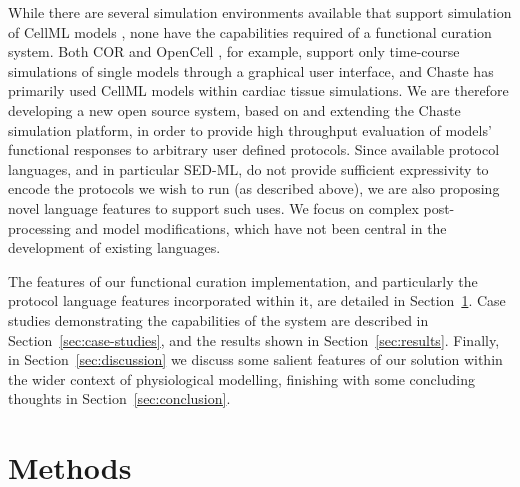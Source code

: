 \documentclass[preprint,authoryear,12pt]{elsarticle}
\newcommand{\secref}[1]{Section~\ref{#1}}
\newcommand{\changed}[1]{#1}
\begin{document}
\changed{While there are several simulation environments available that support simulation of CellML models \citep[see][]{Garny*.08:CellML}, none have the capabilities required of a functional curation system.
Both COR \citep{COR} and OpenCell \citep[formerly known as PCEnv,][]{Garny*.08:CellML}, for example, support only time-course simulations of single models through a graphical user interface, and Chaste \citep{Chaste.CPC} has primarily used CellML models within cardiac tissue simulations.
We are therefore developing a new open source system, based on and extending the Chaste simulation platform, in order to provide high throughput evaluation of models' functional responses to arbitrary user defined protocols.
Since available protocol languages, and in particular SED-ML, do not provide sufficient expressivity to encode the protocols we wish to run (as described above), we are also proposing novel language features to support such uses.
We focus on complex post-processing and model modifications, which have not been central in the development of existing languages.}




The features of \changed{our functional curation implementation, and particularly the protocol language features incorporated within it}, are detailed in \secref{sec:methods}.
Case studies demonstrating the capabilities of the system are described in \secref{sec:case-studies}, and the results shown in \secref{sec:results}.
Finally, in \secref{sec:discussion} we discuss some salient features of our solution within the wider context of physiological modelling, finishing with some concluding thoughts in \secref{sec:conclusion}.



\section{Methods}
\label{sec:methods}
\end{document}
